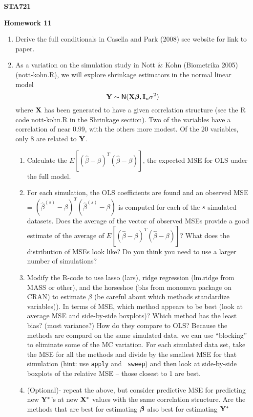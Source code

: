\documentclass[12pt]{article}
\begin{document}
{\bf STA721  }
\vspace{.1in}
\begin{center}
{\large \bf Homework 11} \\
\end{center}
\vspace{.5in}
\noindent

\begin{enumerate}
\item Derive the full conditionals in Casella and Park (2008) see
  website for link to paper.
\item  As a variation on the simulation study in Nott \& Kohn (Biometrika
2005) (nott-kohn.R), we will explore shrinkage estimators in the normal linear model 
\begin{equation}
  \label{eq:model}
\mathbf{Y} \sim \textsf{N}(\mathbf{X} \boldsymbol{\beta}, \mathbf{I}_n\sigma^2)
\end{equation}
where $\mathbf{X}$ has been generated to have a given correlation structure
(see the R code nott-kohn.R in the Shrinkage section).  Two of the
variables have a correlation of near 0.99, with the others more
modest.  Of the 20 variables, only 8 are related to $\mathbf{Y}$.


\begin{enumerate}
\item Calculate the $E[(\hat{\beta} - \beta)^T(\hat{\beta} - \beta)]$,
  the expected MSE for OLS under the full model. 
\item For each simulation, the OLS coefficients are found and an
  observed MSE = $(\hat{\beta}^{(s)} - \beta)^T(\hat{\beta}^{(s)} -
  \beta)$ is computed for each of the $s$ simulated datasets.  Does
  the average of the vector of observed MSEs provide a good estimate
  of the average of $E[(\hat{\beta} - \beta)^T(\hat{\beta} - \beta)]$?
  What does the distribution of MSEs look like?  Do you think you need
  to use a larger number of simulations?    

\item Modify the R-code to use lasso (lars), ridge regression
  (lm.ridge from MASS or other), and the horseshoe (bhs from monomvn package on CRAN) to
  estimate $\beta$ (be careful about which methods standardize
  variables)).  In terms of MSE, which method appears to be best (look
  at average MSE and side-by-side boxplots)?  Which method has the
  least bias? (most variance?)  How do they compare to OLS?  Because
  the methods are compard on the same simulated data, we can use
  ``blocking'' to eliminate some of the MC variation. For each
  simulated data set, take the MSE for all the methods and divide by
  the smallest MSE for that simulation (hint: use {\tt apply} and {\tt
    sweep}) and then look at side-by-side boxplots of the relative MSE
  -- those closest to 1 are best.
\item (Optional)- repeat the above, but consider predictive MSE for
  predicting new $\mathbf{Y}^*$'s at new $\mathbf{X}^*$ values with the same correlation
  structure.  Are the methods that are best for estimating $\boldsymbol{\beta}$ also
  best for estimating $\mathbf{Y}^*$
\end{enumerate}
\end{enumerate}
\end{document}
